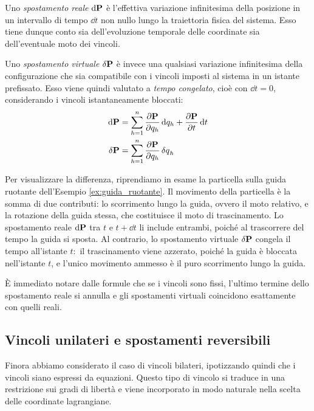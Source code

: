 \begin{definition}
    Uno \emph{spostamento reale} $\dd{\vb{P}}$ è l'effettiva variazione infinitesima della posizione in un intervallo di tempo $\dd{t}$ non nullo lungo la traiettoria fisica del sistema. Esso tiene dunque conto sia dell'evoluzione temporale delle coordinate sia dell'eventuale moto dei vincoli.
    
    Uno \emph{spostamento virtuale} $\var{\vb{P}}$ è invece una qualsiasi variazione infinitesima della configurazione che sia compatibile con i vincoli imposti al sistema in un istante prefissato. Esso viene quindi valutato a \emph{tempo congelato}, cioè con $\dd{t} = 0$, considerando i vincoli istantaneamente bloccati:
    \begin{align*}
        \dd{\vb{P}} &= \sum_{h=1}^n \pdv{\vb{P}}{q_h} \dd{q_h} + \pdv{\vb{P}}{t} \dd{t} \\
        \var{\vb{P}} &= \sum_{h=1}^n \pdv{\vb{P}}{q_h} \var{q}_h
    \end{align*}
\end{definition}

Per visualizzare la differenza, riprendiamo in esame la particella sulla guida ruotante dell'Esempio \ref{ex:guida_ruotante}. Il movimento della particella è la somma di due contributi: lo scorrimento lungo la guida, ovvero il moto relativo, e la rotazione della guida stessa, che costituisce il moto di trascinamento. Lo spostamento reale $\dd{\vb{P}}$ tra $t$ e $t + \dd{t}$ li include entrambi, poiché al trascorrere del tempo la guida si sposta. Al contrario, lo spostamento virtuale $\var{\vb{P}}$ congela il tempo all'istante $t$:~il trascinamento viene azzerato, poiché la guida è bloccata nell'istante $t$, e l'unico movimento ammesso è il puro scorrimento lungo la guida.

È immediato notare dalle formule che se i vincoli sono fissi, l'ultimo termine dello spostamento reale si annulla e gli spostamenti virtuali coincidono esattamente con quelli reali.

\subsection{Vincoli unilateri e spostamenti reversibili}
Finora abbiamo considerato il caso di vincoli bilateri, ipotizzando quindi che i vincoli siano espressi da equazioni. Questo tipo di vincolo si traduce in una restrizione sui gradi di libertà e viene incorporato in modo naturale nella scelta delle coordinate lagrangiane.

